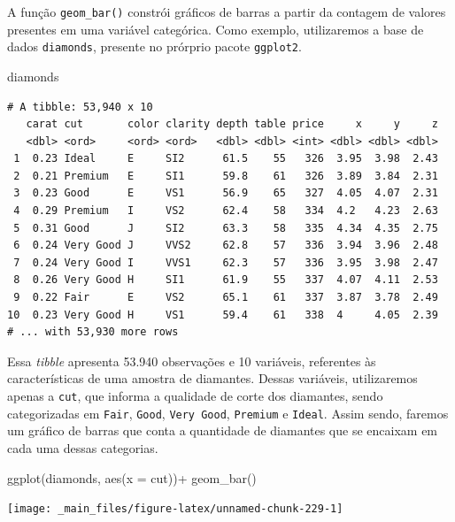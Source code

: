 \documentclass[
  brazilian,
]{book}
\newenvironment{Shaded}{\begin{snugshade}}{\end{snugshade}}
\newcommand{\AttributeTok}[1]{\textcolor[rgb]{0.77,0.63,0.00}{#1}}
\newcommand{\FunctionTok}[1]{\textcolor[rgb]{0.00,0.00,0.00}{#1}}
\newcommand{\NormalTok}[1]{#1}
\newcommand{\SpecialCharTok}[1]{\textcolor[rgb]{0.00,0.00,0.00}{#1}}
\begin{document}
A função \texttt{geom\_bar()} constrói gráficos de barras a partir da contagem de valores presentes em uma variável categórica. Como exemplo, utilizaremos a base de dados \texttt{diamonds}, presente no prórprio pacote \texttt{ggplot2}.

\begin{Shaded}
\begin{Highlighting}[]
\NormalTok{diamonds}
\end{Highlighting}
\end{Shaded}

\begin{verbatim}
# A tibble: 53,940 x 10
   carat cut       color clarity depth table price     x     y     z
   <dbl> <ord>     <ord> <ord>   <dbl> <dbl> <int> <dbl> <dbl> <dbl>
 1  0.23 Ideal     E     SI2      61.5    55   326  3.95  3.98  2.43
 2  0.21 Premium   E     SI1      59.8    61   326  3.89  3.84  2.31
 3  0.23 Good      E     VS1      56.9    65   327  4.05  4.07  2.31
 4  0.29 Premium   I     VS2      62.4    58   334  4.2   4.23  2.63
 5  0.31 Good      J     SI2      63.3    58   335  4.34  4.35  2.75
 6  0.24 Very Good J     VVS2     62.8    57   336  3.94  3.96  2.48
 7  0.24 Very Good I     VVS1     62.3    57   336  3.95  3.98  2.47
 8  0.26 Very Good H     SI1      61.9    55   337  4.07  4.11  2.53
 9  0.22 Fair      E     VS2      65.1    61   337  3.87  3.78  2.49
10  0.23 Very Good H     VS1      59.4    61   338  4     4.05  2.39
# ... with 53,930 more rows
\end{verbatim}

Essa \emph{tibble} apresenta 53.940 observações e 10 variáveis, referentes às características de uma amostra de diamantes. Dessas variáveis, utilizaremos apenas a \texttt{cut}, que informa a qualidade de corte dos diamantes, sendo categorizadas em \texttt{Fair}, \texttt{Good}, \texttt{Very\ Good}, \texttt{Premium} e \texttt{Ideal}. Assim sendo, faremos um gráfico de barras que conta a quantidade de diamantes que se encaixam em cada uma dessas categorias.

\begin{Shaded}
\begin{Highlighting}[]
\FunctionTok{ggplot}\NormalTok{(diamonds,}
       \FunctionTok{aes}\NormalTok{(}\AttributeTok{x =}\NormalTok{ cut))}\SpecialCharTok{+}
  \FunctionTok{geom\_bar}\NormalTok{()}
\end{Highlighting}
\end{Shaded}

\begin{center}\texttt{[image: \_main\_files/figure-latex/unnamed-chunk-229-1]} \end{center}
\end{document}

